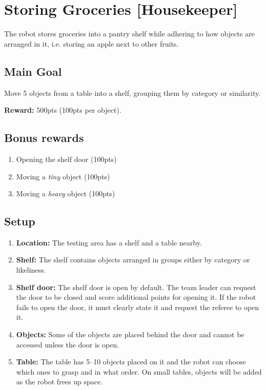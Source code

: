 \section{Storing Groceries [Housekeeper]}
\label{test:storing-groceries}
The robot stores groceries into a pantry shelf while adhering to how objects are arranged in it, i.e. storing an apple next to other fruits.


\subsection*{Main Goal}
Move 5 objects from a table into a shelf, grouping them by category or similarity.

\noindent\textbf{Reward:} 500pts (100pts per object).\\

\subsection*{Bonus rewards}
\begin{enumerate}[nosep]
	\item Opening the shelf door (100pts)
	\item Moving a \emph{tiny} object (100pts)
	\item Moving a \emph{heavy} object (100pts)
\end{enumerate}

%
%
\subsection*{Setup}
\begin{enumerate}
	\item \textbf{Location:} The testing area has a shelf and a table nearby.

	\item \textbf{Shelf:} The shelf contains objects arranged in groups either by category or likeliness.

	\item \textbf{Shelf door:} The shelf door is open by default.
	The team leader can request the door to be closed and score additional points for opening it. If the robot fails to open the door, it must clearly state it and request the referee to open it.

	\item \textbf{Objects:} Some of the objects are placed behind the door and cannot be accessed unless the door is open.

	\item \textbf{Table:} The table has 5--10 objects placed on it and the robot can choose which ones to grasp and in what order. On small tables, objects will be added as the robot frees up space.
\end{enumerate}


